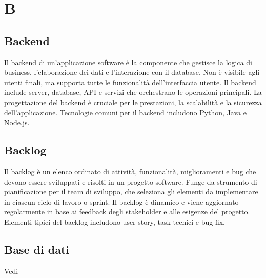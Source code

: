 \section{B}

\vspace{2em}
\subsection*{Backend}
\par Il backend di un'applicazione software è la componente che gestisce la logica di business, l'elaborazione dei dati e l'interazione con il database. Non è visibile agli utenti finali, ma supporta tutte le funzionalità dell'interfaccia utente. Il backend include server, database, API e servizi che orchestrano le operazioni principali. La progettazione del backend è cruciale per le prestazioni, la scalabilità e la sicurezza dell'applicazione. Tecnologie comuni per il backend includono Python, Java e Node.js.

\vspace{2em}
\subsection*{Backlog}
\par Il backlog è un elenco ordinato di attività, funzionalità, miglioramenti e bug che devono essere sviluppati e risolti in un progetto software. Funge da strumento di pianificazione per il team di sviluppo, che seleziona gli elementi da implementare in ciascun ciclo di lavoro o sprint. Il backlog è dinamico e viene aggiornato regolarmente in base ai feedback degli stakeholder e alle esigenze del progetto. Elementi tipici del backlog includono user story, task tecnici e bug fix.

\vspace{2em}
\subsection*{Base di dati}
\par Vedi 

